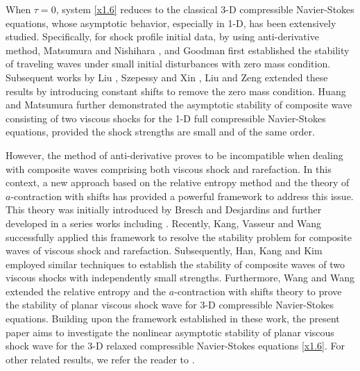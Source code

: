 \documentclass[10pt,reqno]{amsart}
\numberwithin{equation}{section}
\begin{document}
When $\tau=0$, system \eqref{x1.6} reduces to the classical 3-D compressible Navier-Stokes equations, whose asymptotic behavior, especially in 1-D, has been extensively studied. Specifically, for shock profile initial data, by using anti-derivative method, Matsumura and Nishihara \cite{MNS}, and Goodman \cite{GD} first established the stability of traveling waves under small initial disturbances with zero mass condition. Subsequent works by Liu \cite{LTP}, Szepessy and Xin \cite{SXIN}, Liu and Zeng \cite{LTPZ} extended these results by introducing constant shifts to remove the zero mass condition. Huang and Matsumura \cite{HM} further demonstrated the asymptotic stability of composite wave consisting of two viscous shocks for the 1-D full compressible Navier-Stokes equations, provided the shock strengths are small and of the same order.

However, the method of anti-derivative proves to be incompatible when dealing with composite waves comprising both viscous shock and rarefaction. In this context, a new approach based on the relative entropy method and the theory of $a$-contraction with shifts has provided a powerful framework to address this issue. This theory was initially introduced by Bresch and Desjardins \cite{BD} and further developed in a series works including \cite{KV1, KV3, KV6, KV8, KV10, KV11, KV2, V27, V28}. Recently, Kang, Vasseur and Wang \cite{WY} successfully applied this framework to resolve the stability problem for composite waves of viscous shock and rarefaction. Subsequently, Han, Kang and Kim \cite{SMJ} employed similar techniques to establish the stability of composite waves of two viscous shocks with independently small strengths. Furthermore, Wang and Wang \cite{WWS} extended the relative entropy and the $a$-contraction with shifts theory to prove the stability of planar viscous shock wave for 3-D compressible Navier-Stokes equations. Building upon the framework established in these work, the present paper aims to investigate the nonlinear asymptotic stability of planar viscous shock wave for the 3-D relaxed compressible Navier-Stokes equations \eqref{x1.6}. For other related results, we refer the reader to \cite{MNR1, MNR2, LW, LWW}.

\end{document}
